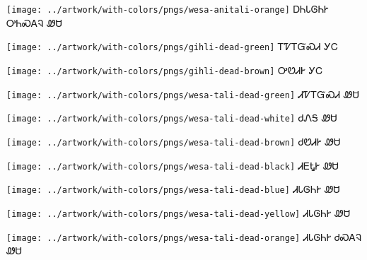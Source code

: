 \documentclass[avery5371]{flashcards}%
\begin{document}
    \begin{flashcard}{
        \texttt{[image: ../artwork/with-colors/pngs/wesa-anitali-orange]}
    }
        \Huge ᎠᏂᏓᎶᏂᎨ ᎤᏂᏍᎪᎸ ᏪᏌ
    \end{flashcard}

    \begin{flashcard}{
        \texttt{[image: ../artwork/with-colors/pngs/gihli-dead-green]}
    }
        \Huge ᎢᏤᎢᏳᏍᏗ ᎩᏟ
    \end{flashcard}

    \begin{flashcard}{
        \texttt{[image: ../artwork/with-colors/pngs/gihli-dead-brown]}
    }
        \Huge ᎤᏬᏗᎨ ᎩᏟ
    \end{flashcard}

    \begin{flashcard}{
        \texttt{[image: ../artwork/with-colors/pngs/wesa-tali-dead-green]}
    }
        \Huge ᏗᏤᎢᏳᏍᏗ ᏪᏌ
    \end{flashcard}

    \begin{flashcard}{
        \texttt{[image: ../artwork/with-colors/pngs/wesa-tali-dead-white]}
    }
        \Huge ᏧᏁᎦ ᏪᏌ
    \end{flashcard}
    \begin{flashcard}{
        \texttt{[image: ../artwork/with-colors/pngs/wesa-tali-dead-brown]}
    }
        \Huge ᏧᏬᏗᎨ ᏪᏌ
    \end{flashcard}
    \begin{flashcard}{
        \texttt{[image: ../artwork/with-colors/pngs/wesa-tali-dead-black]}
    }
        \Huge ᏗᎬᎿᎨ ᏪᏌ
    \end{flashcard}
    \begin{flashcard}{
        \texttt{[image: ../artwork/with-colors/pngs/wesa-tali-dead-blue]}
    }
        \Huge ᏗᏓᎶᏂᎨ ᏪᏌ
    \end{flashcard}
    \begin{flashcard}{
        \texttt{[image: ../artwork/with-colors/pngs/wesa-tali-dead-yellow]}
    }
        \Huge ᏗᏓᎶᏂᎨ ᏪᏌ
    \end{flashcard}
    \begin{flashcard}{
        \texttt{[image: ../artwork/with-colors/pngs/wesa-tali-dead-orange]}
    }
        \Huge ᏗᏓᎶᏂᎨ ᏧᏍᎪᎸ ᏪᏌ
    \end{flashcard}
\end{document}
